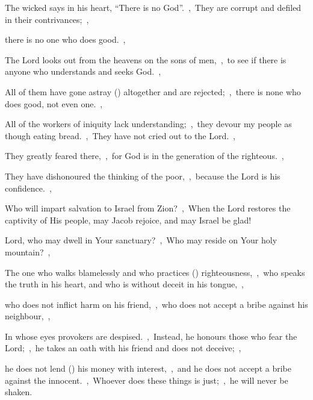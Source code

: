 \documentclass[12pt,twoside,a5paper]{article}
\begin{document}

\begin{normalparskip}
  The wicked says in his heart, ``There is no God''.~\sep\ They are corrupt and defiled in their contrivances;~\sep


  there is no one who does good.~\sep

  The Lord looks out from the heavens on the sons of men,~\sep\ to see if there is anyone who understands and seeks God.~\sep

  All of them have gone astray () altogether and are rejected;~\sep\ there is none who does good, not even one.~\sep

  All of the workers of iniquity lack understanding;~\sep\ they devour my people as though eating bread.~\sep\ They have not cried out to the Lord.~\sep

  They greatly feared there,~\sep\ for God is in the generation of the righteous.~\sep

  They have dishonoured the thinking of the poor,~\sep\ because the Lord is his confidence.~\sep

  Who will impart salvation to Israel from Zion?~\sep\ When the Lord restores the captivity of His people, may Jacob rejoice, and may Israel be glad!
\end{normalparskip}




\begin{normalparskip}
  Lord, who may dwell in Your sanctuary?~\sep\ Who may reside on Your holy mountain?~\sep


  The one who walks blamelessly and who practices () righteousness,~\sep\ who speaks the truth in his heart, and who is without deceit in his tongue,~\sep

  who does not inflict harm on his friend,~\sep\ who does not accept a bribe against his neighbour,~\sep

  In whose eyes provokers are despised.~\sep\ Instead, he honours those who fear the Lord;~\sep\ he takes an oath with his friend and does not deceive;~\sep

  he does not lend () his money with interest,~\sep\ and he does not accept a bribe against the innocent.~\sep\ Whoever does these things is just;~\sep\ he will never be shaken.
\end{normalparskip}
\end{document}
